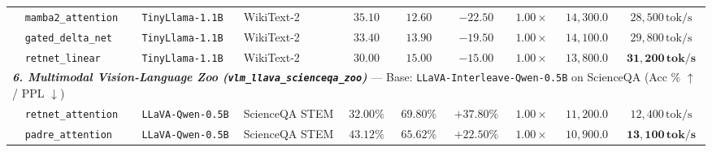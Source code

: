 \begin{table}[t]
{\begin{tabular}{l l l l c c c c c c}
& \texttt{mamba2\_attention} & \texttt{TinyLlama-1.1B} & WikiText-2 & $35.10$ & $\mathbf{12.60}$ & $-22.50$ & $1.00\times$ & $14{,}300.0$ & $28{,}500\,\text{tok/s}$ \\
& \texttt{gated\_delta\_net} & \texttt{TinyLlama-1.1B} & WikiText-2 & $33.40$ & $13.90$ & $-19.50$ & $1.00\times$ & $14{,}100.0$ & $29{,}800\,\text{tok/s}$ \\
& \texttt{retnet\_linear} & \texttt{TinyLlama-1.1B} & WikiText-2 & $30.00$ & $15.00$ & $-15.00$ & $1.00\times$ & $13{,}800.0$ & $\mathbf{31{,}200\,\text{tok/s}}$ \\
\midrule
\multicolumn{10}{l}{\textit{\textbf{6. Multimodal Vision-Language Zoo (\texttt{vlm\_llava\_scienceqa\_zoo})}} --- Base: \texttt{LLaVA-Interleave-Qwen-0.5B} on ScienceQA (Acc \% $\uparrow$ / PPL $\downarrow$)} \\
& \texttt{retnet\_attention} & \texttt{LLaVA-Qwen-0.5B} & ScienceQA STEM & $32.00\%$ & $\mathbf{69.80\%}$ & $+37.80\%$ & $1.00\times$ & $11{,}200.0$ & $12{,}400\,\text{tok/s}$ \\
& \texttt{padre\_attention} & \texttt{LLaVA-Qwen-0.5B} & ScienceQA STEM & $43.12\%$ & $65.62\%$ & $+22.50\%$ & $1.00\times$ & $10{,}900.0$ & $\mathbf{13{,}100\,\text{tok/s}}$ \\
\bottomrule
\end{tabular}}
\end{table}

